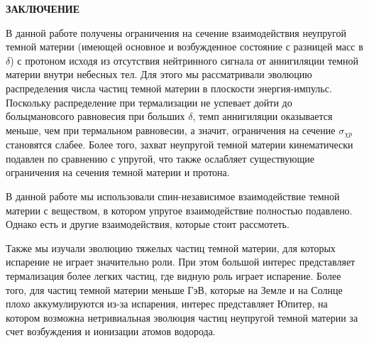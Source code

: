 \clearpage
\newpage
\begin{center}
	\textbf{\large ЗАКЛЮЧЕНИЕ}
\end{center}


В данной работе получены ограничения на сечение взаимодействия неупругой темной материи (имеющей основное и возбужденное состояние с разницей масс в $\delta$) с протоном исходя из отсутствия нейтринного сигнала от аннигиляции темной материи внутри небесных тел.
Для этого мы рассматривали эволюцию распределения числа частиц темной материи в плоскости энергия-импульс. Поскольку распределение при термализации не успевает дойти до больцмановсого равновесия при больших $\delta$, темп аннигиляции оказывается меньше, чем при термальном равновесии, а значит, ограничения на сечение $\sigma_{\chi p}$  становятся слабее. Более того, захват неупругой темной материи кинематически подавлен по сравнению с упругой, что также ослабляет существующие ограничения на сечения темной материи и протона.

В данной работе мы использовали спин-независимое взаимодействие темной материи с веществом, в котором упругое взаимодействие полностью подавлено. Однако есть и другие взаимодействия, которые стоит рассмотеть.

Также мы изучали эволюцию тяжелых частиц темной материи, для которых испарение не играет значительно роли. При этом большой интерес представляет термализация более легких частиц, где видную роль играет испарение. Более того, для частиц темной материи меньше ГэВ, которые на Земле и на Солнце плохо аккумулируются из-за испарения, интерес представляет Юпитер, на котором возможна нетривиальная эволюция частиц неупругой темной материи за счет возбуждения и ионизации атомов водорода.